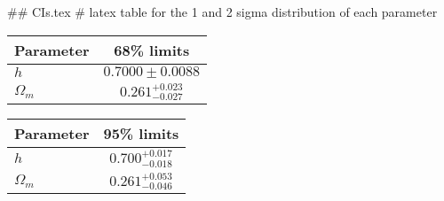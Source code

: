 ## CIs.tex
# latex table for the 1 and 2 sigma distribution of each parameter

\begin{tabular} { l  c}
 Parameter &  68\% limits\\
\hline
{\boldmath$h              $} & $0.7000\pm 0.0088          $\\
{\boldmath$\Omega_m       $} & $0.261^{+0.023}_{-0.027}   $\\
\hline
\end{tabular}

\begin{tabular} { l  c}
 Parameter &  95\% limits\\
\hline
{\boldmath$h              $} & $0.700^{+0.017}_{-0.018}   $\\
{\boldmath$\Omega_m       $} & $0.261^{+0.053}_{-0.046}   $\\
\hline
\end{tabular}
